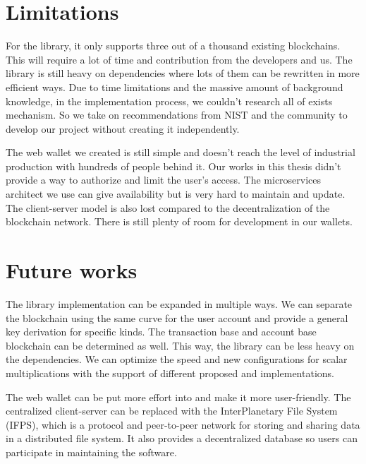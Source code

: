\section{Limitations}

For the library, it only supports three out of a thousand existing blockchains. This will require a lot of time and contribution from the developers and us. The library is still heavy on dependencies where lots of them can be rewritten in more efficient ways. Due to time limitations and the massive amount of background knowledge, in the implementation process, we couldn't research all of exists mechanism. So we take on recommendations from NIST and the community to develop our project without creating it independently.
\bigskip

The web wallet we created is still simple and doesn't reach the level of industrial production with hundreds of people behind it. Our works in this thesis didn't provide a way to authorize and limit the user's access. The microservices architect we use can give availability but is very hard to maintain and update. The client-server model is also lost compared to the decentralization of the blockchain network. There is still plenty of room for development in our wallets.

\section{Future works}

The library implementation can be expanded in multiple ways. We can separate the blockchain using the same curve for the user account and provide a general key derivation for specific kinds. The transaction base and account base blockchain can be determined as well. This way, the library can be less heavy on the dependencies. We can optimize the speed and new configurations for scalar multiplications with the support of different proposed and implementations. 
\bigskip

The web wallet can be put more effort into and make it more user-friendly. The centralized client-server can be replaced with the InterPlanetary File System (IFPS), which is a protocol and peer-to-peer network for storing and sharing data in a distributed file system. It also provides a decentralized database so users can participate in maintaining the software.

